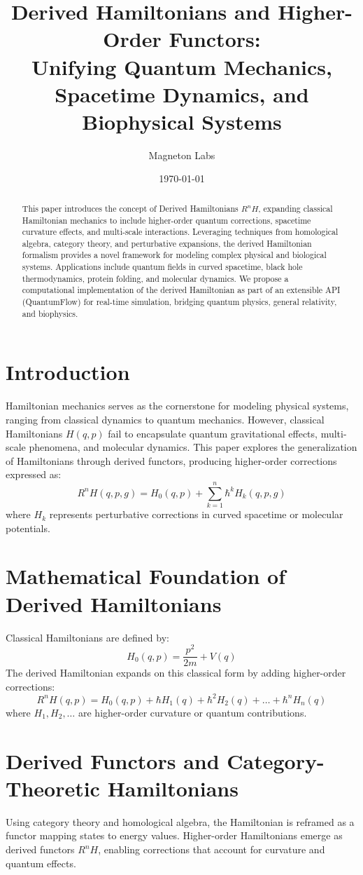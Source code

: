 \documentclass{article}
\title{Derived Hamiltonians and Higher-Order Functors: \\ Unifying Quantum Mechanics, Spacetime Dynamics, and Biophysical Systems}
\author{Magneton Labs}
\date{\today}
\begin{document}
\maketitle

\begin{abstract}
This paper introduces the concept of Derived Hamiltonians \( R^nH \), expanding classical Hamiltonian mechanics to include higher-order quantum corrections, spacetime curvature effects, and multi-scale interactions. Leveraging techniques from homological algebra, category theory, and perturbative expansions, the derived Hamiltonian formalism provides a novel framework for modeling complex physical and biological systems. Applications include quantum fields in curved spacetime, black hole thermodynamics, protein folding, and molecular dynamics. We propose a computational implementation of the derived Hamiltonian as part of an extensible API (QuantumFlow) for real-time simulation, bridging quantum physics, general relativity, and biophysics.
\end{abstract}

\tableofcontents

\section{Introduction}
Hamiltonian mechanics serves as the cornerstone for modeling physical systems, ranging from classical dynamics to quantum mechanics. However, classical Hamiltonians \( H(q, p) \) fail to encapsulate quantum gravitational effects, multi-scale phenomena, and molecular dynamics. This paper explores the generalization of Hamiltonians through derived functors, producing higher-order corrections expressed as:
\[
R^nH(q, p, g) = H_0(q, p) + \sum_{k=1}^n \hbar^k H_k(q, p, g)
\]
where \( H_k \) represents perturbative corrections in curved spacetime or molecular potentials.

\section{Mathematical Foundation of Derived Hamiltonians}
Classical Hamiltonians are defined by:
\[
H_0(q, p) = \frac{p^2}{2m} + V(q)
\]
The derived Hamiltonian expands on this classical form by adding higher-order corrections:
\[
R^nH(q, p) = H_0(q, p) + \hbar H_1(q) + \hbar^2 H_2(q) + \dots + \hbar^n H_n(q)
\]
where \( H_1, H_2, \dots \) are higher-order curvature or quantum contributions.

\section{Derived Functors and Category-Theoretic Hamiltonians}
Using category theory and homological algebra, the Hamiltonian is reframed as a functor mapping states to energy values. Higher-order Hamiltonians emerge as derived functors \( R^nH \), enabling corrections that account for curvature and quantum effects.
\end{document}
